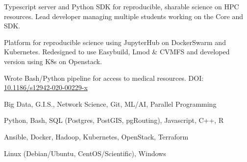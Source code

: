 \documentclass{acmresume}
\begin{document}
        \begin{titemize}
        \end{titemize}

        \begin{titemize}
        \end{titemize}
    
    
    

    \begin{titemize}
        \titem Typescript server and Python SDK for reproducible, sharable science on HPC resources.
        \titem Lead developer managing multiple students working on the Core and SDK.
    \end{titemize}

    \begin{titemize}
    	\titem Platform for reproducible science using JupyterHub on DockerSwarm and Kubernetes.
    	\titem Redesigned to use Easybuild, Lmod \& CVMFS and developed version using K8s on Openstack.
    \end{titemize}
    
    \begin{titemize}
    	\titem Wrote Bash/Python pipeline for access to medical resources. DOI: \href{https://doi.org/10.1186/s12942-020-00229-x}{10.1186/s12942-020-00229-x}
    \end{titemize}
    
    
    
    

        \begin{description}[topsep=0pt,itemsep=0pt]
        	 Big Data, G.I.S., Network Science, Git, ML/AI, Parallel Programming
        	
        	\desc[Languages:] Python, Bash, SQL (Postgres, PostGIS, pgRouting), Javascript, C++, R
        	
        	\desc[Technologies:] Ansible, Docker, Hadoop, Kubernetes, OpenStack, Terraform
        	
        	 Linux (Debian/Ubuntu, CentOS/Scientific), Windows
        \end{description}

	
\end{document}
